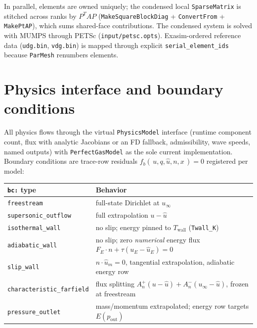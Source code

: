 \documentclass[11pt]{article}
\newcommand{\code}[1]{\texttt{#1}}
\newcommand{\uhat}{\hat{u}}
\begin{document}
In parallel, elements are owned uniquely; the condensed local
\code{SparseMatrix} is stitched across ranks by
$P^T A P$ (\code{MakeSquareBlockDiag} + \code{ConvertFrom} +
\code{MakePtAP}), which sums shared-face contributions. The condensed
system is solved with MUMPS through PETSc
(\code{input/petsc.opts}). Exasim-ordered reference data (\code{udg.bin},
\code{vdg.bin}) is mapped through explicit \code{serial\_element\_ids}
because \code{ParMesh} renumbers elements.

\section{Physics interface and boundary conditions}

All physics flows through the virtual \code{PhysicsModel} interface
(runtime component count, flux with analytic Jacobians or an FD
fallback, admissibility, wave speeds, named outputs) with
\code{PerfectGasModel} as the sole current implementation. Boundary
conditions are trace-row residuals $f_b(\,u, q, \uhat, n, x\,) = 0$
registered per model:

\begin{center}
\begin{tabular}{ll}
\toprule
\code{bc:} type & Behavior \\
\midrule
\code{freestream}            & full-state Dirichlet at $u_\infty$ \\
\code{supersonic\_outflow}   & full extrapolation $u - \uhat$ \\
\code{isothermal\_wall}      & no slip; energy pinned to
                               $T_{\mathrm{wall}}$ (\code{Twall\_K}) \\
\code{adiabatic\_wall}       & no slip; zero \emph{numerical} energy
                               flux $F_E\cdot n + \tau(u_E-\uhat_E)=0$ \\
\code{slip\_wall}            & $n\cdot\uhat_m = 0$, tangential
                               extrapolation, adiabatic energy row \\
\code{characteristic\_farfield} & flux splitting
                               $A_n^+(u-\uhat) + A_n^-(u_\infty-\uhat)$,
                               frozen at freestream \\
\code{pressure\_outlet}      & mass/momentum extrapolated; energy row
                               targets $E(p_{\mathrm{out}})$ \\
\bottomrule
\end{tabular}
\end{center}
\end{document}
